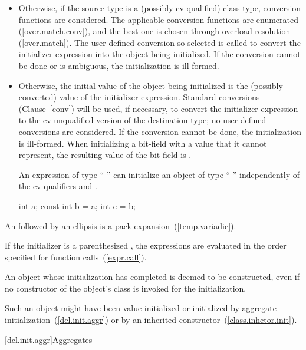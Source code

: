 \begin{itemize}
\item
Otherwise, if the source type
is a (possibly cv-qualified) class type, conversion functions are
considered.
The applicable conversion functions are enumerated
(\ref{over.match.conv}), and the best one is chosen through overload
resolution (\ref{over.match}).
The user-defined conversion so selected
is called to convert the initializer expression into the
object being initialized.
If the conversion cannot be done or is
ambiguous, the initialization is ill-formed.
\item
Otherwise, the initial value of the object being initialized is
the (possibly converted) value of the initializer expression.
Standard conversions (Clause~\ref{conv}) will be used, if necessary,
to convert the initializer expression to the cv-unqualified version of
the destination type;
no user-defined conversions are considered.
If the conversion cannot
be done, the initialization is ill-formed.
When initializing a bit-field with a value that it cannot represent, the
resulting value of the bit-field is
.
%
\begin{note}
An expression of type
`` ''
can initialize an object of type
`` ''
independently of
the cv-qualifiers
and .

\begin{codeblock}
int a;
const int b = a;
int c = b;
\end{codeblock}
\end{note}
\end{itemize}

\pnum
An  followed by an ellipsis is a
pack expansion~(\ref{temp.variadic}).

\pnum
If the initializer is a parenthesized ,
the expressions are evaluated in the order
specified for function calls~(\ref{expr.call}).

\pnum
An object whose initialization has completed
is deemed to be constructed,
even if no constructor of the object's class
is invoked for the initialization.
\begin{note}
Such an object might have been value-initialized
or initialized by aggregate initialization~(\ref{dcl.init.aggr})
or by an inherited constructor~(\ref{class.inhctor.init}).
\end{note}

[dcl.init.aggr]{Aggregates}%
%
%
%
%
%
%

